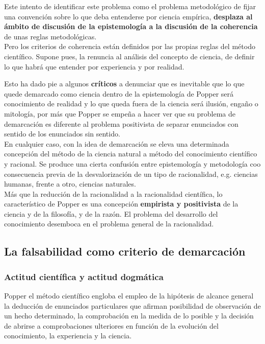 \documentclass[a4paper, 11pt, twocolumn, spanish]{article}
\begin{document}
Este intento de identificar este problema como el problema
metodológico de fijar una convención sobre lo que deba entenderse por
ciencia empírica, \textbf{desplaza al ámbito de discusión de la epistemología
a la discusión de la coherencia} de unas reglas metodológicas.\\[0pt]
Pero los criterios de coherencia están definidos por las propias
reglas del método científico. Supone pues, la renuncia al análisis del
concepto de ciencia, de definir lo que habrá que entender por
experiencia y por realidad.

Esto ha dado pie a algunos \textbf{críticos} a denunciar que es inevitable
que lo que quede demarcado como ciencia dentro de la epistemología de
Popper será conocimiento de realidad y lo que queda fuera de la
ciencia será ilusión, engaño o mitología, por más que Popper se empeña
a hacer ver que su problema de demarcación es diferente al problema
positivista de separar enunciados con sentido de los enunciados sin
sentido.\\[0pt]

En cualquier caso, con la idea de demarcación se eleva una determinada
concepción del método de la ciencia natural a método del conocimiento
científico y racional. Se produce una cierta confusión entre
epistemología y metodología coo consecuencia previa de la
desvalorización de un tipo de racionalidad, e.g. ciencias humanas,
frente a otro, ciencias naturales.\\[0pt]
Más que la reducción de la racionalidad a la racionalidad científica,
lo característico de Popper es una concepción \textbf{empirista y
positivista} de la ciencia y de la filosofía, y de la razón. El
problema del desarrollo del conocimiento desemboca en el problema
general de la racionalidad.

\subsection{La falsabilidad como criterio de demarcación}
\label{sec:org0155f7b}

\subsubsection{Actitud científica y actitud dogmática}
\label{sec:orge1ea64c}
Popper el método científico engloba el empleo de la hipótesis de
alcance general la deducción de enunciados particulares que afirman
posibilidad de observación de un hecho determinado, la comprobación en
la medida de lo posible y la decisión de abrirse a comprobaciones
ulteriores en función de la evolución del conocimiento, la experiencia
y la ciencia.\\[0pt]
\end{document}
